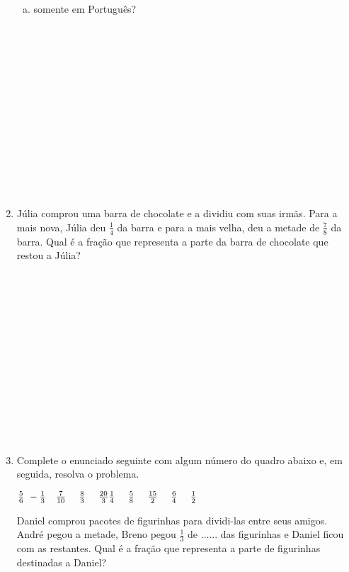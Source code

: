 \documentclass[a4paper,14pt]{article}
\begin{document}
\begin{multicols}{2}
\begin{enumerate}
\begin{enumerate}[a)]
   				\item somente em Português? \\\\\\\\\\\\\\\\\\\\\\\\\\\\
   			\end{enumerate}
   			\item Júlia comprou uma barra de chocolate e a dividiu com suas irmãs. Para a mais nova, Júlia deu $\frac{1}{4}$ da barra e para a mais velha, deu a metade de $\frac{7}{8}$ da barra. Qual é a fração que representa a parte da barra de chocolate que restou a Júlia? \\\\\\\\\\\\\\\\\\\\\\\\\\\\
   			\item Complete o enunciado seguinte com algum número do quadro abaixo e, em seguida, resolva o problema.
   			\begin{center} \begin{tcolorbox}[colback=white, colframe=black, boxrule=0.5mm, width=6cm]
   					$\frac{5}{6} ~ -\frac{1}{3} ~~~ \frac{7}{10} ~~~~ \frac{8}{3} ~~~~ \frac{20}{3} \\\\\\ \frac{1}{4} ~~~~ \frac{5}{8} ~~~~ \frac{15}{2} ~~~~ \frac{6}{4} ~~~~ \frac{1}{2}$
   				\end{tcolorbox}
   			\end{center}
   			Daniel comprou pacotes de figurinhas para dividi-las entre seus amigos. André pegou a metade, Breno pegou $\frac{1}{3}$ de ...... das figurinhas e Daniel ficou com as restantes. Qual é a fração que representa a parte de figurinhas destinadas a Daniel? \\\\\\\\\\\\\\\\\\\\\\\\\\\\

\end{enumerate}
\end{multicols}
\end{document}
